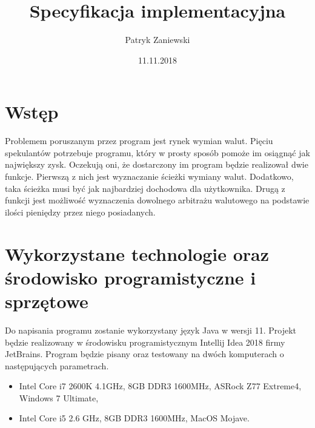 ﻿\documentclass[12pt]{article}
\title{Specyfikacja implementacyjna}
\author{Patryk Zaniewski}
\date{11.11.2018}
\begin{document}
\maketitle

\tableofcontents
\newpage

\section{Wstęp}
Problemem poruszanym przez program jest rynek wymian walut. Pięciu spekulantów potrzebuje programu, który w prosty sposób pomoże im osiągnąć jak największy zysk. Oczekują oni, że dostarczony im program będzie realizował dwie funkcje. Pierwszą z nich jest wyznaczanie ścieżki wymiany walut. Dodatkowo, taka ścieżka musi być jak najbardziej dochodowa dla użytkownika. Drugą z funkcji jest możliwość wyznaczenia dowolnego arbitrażu walutowego na podstawie ilości pieniędzy przez niego posiadanych.

\section{Wykorzystane technologie oraz środowisko programistyczne i sprzętowe}
Do napisania programu zostanie wykorzystany język Java w wersji 11. Projekt będzie realizowany w środowisku programistycznym Intellij Idea 2018 firmy JetBrains. Program będzie pisany oraz testowany na dwóch komputerach o następujących parametrach.

\begin{itemize}
\item  Intel Core i7 2600K 4.1GHz, 8GB DDR3 1600MHz, ASRock Z77 Extreme4, Windows 7 Ultimate,
\item  Intel Core i5 2.6 GHz, 8GB DDR3 1600MHz, MacOS Mojave.
\end{itemize}
\end{document}
